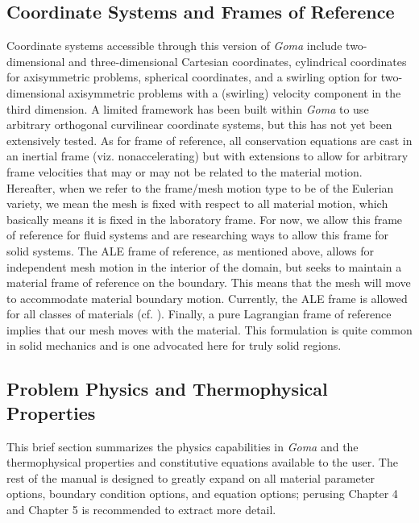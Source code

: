 \subsection{Coordinate Systems and Frames of Reference}
%
%
Coordinate systems accessible through this version of \emph{Goma} include two-dimensional and three-dimensional Cartesian coordinates, cylindrical coordinates for axisymmetric problems, spherical
coordinates, and a swirling option for two-dimensional axisymmetric problems with a (swirling) velocity component in the third dimension. A limited framework has been built within \emph{Goma} to use arbitrary orthogonal curvilinear coordinate systems, but this has not yet been extensively tested. As for frame of reference, all conservation equations are cast in an inertial frame (viz. nonaccelerating) but with extensions to allow for arbitrary frame velocities that may or may not be related to the material motion. Hereafter, when we refer to the frame/mesh motion type to be of the Eulerian variety, we mean the mesh is fixed with respect to all material motion, which basically means it is fixed in the laboratory frame. For now, we allow this frame of reference for fluid systems and are researching ways to allow this frame for solid systems. The ALE frame of reference, as mentioned above, allows for independent mesh motion in the interior of the domain, but seeks to maintain a material frame of reference on the boundary. This means that the mesh will move to accommodate material boundary motion. Currently, the ALE frame is allowed for all classes of materials (cf. \citealt{TALE_SAND}). Finally, a pure Lagrangian frame of reference implies that our mesh moves with the material. This formulation is quite common in solid mechanics and is one advocated here for truly solid regions.
%
%
\subsection{Problem Physics and Thermophysical Properties}
%
%
This brief section summarizes the physics capabilities in \emph{Goma} and the thermophysical properties
and constitutive equations available to the user. The rest of the manual is designed to greatly expand on all material parameter options, boundary condition options, and equation options; perusing Chapter 4 and Chapter 5 is recommended to extract more detail.

